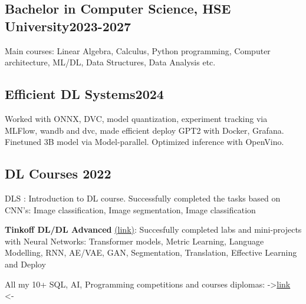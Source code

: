 
\subsection{{Bachelor in Computer Science, HSE University}\hfill 2023-2027}
\vspace*{3pt}
Main courses: Linear Algebra, Calculus, Python programming, Computer architecture, ML/DL, Data Structures, Data Analysis etc.
\vspace*{10pt}


\subsection{{Efficient DL Systems}\hfill 2024}
\vspace*{3pt}
Worked with ONNX, DVC, model quantization, experiment tracking via MLFlow, wandb and dvc, made efficient deploy GPT2 with Docker, Grafana. Finetuned 3B model via Model-parallel. Optimized inference with OpenVino. 

\vspace*{10pt}

\subsection{{DL Courses }\hfill 2022}
\begin{zitemize}
\item DLS : Introduction to DL course. Successfully completed the tasks based on CNN's: Image classification, Image segmentation, Image classification
\item \textbf{Tinkoff DL/DL Advanced} \href{https://github.com/Slavikss/tinkoff_DL}{(link)}: Succesfully completed labs and mini-projects with Neural Networks: Transformer models, Metric Learning, Language Modelling, RNN, AE/VAE, GAN, Segmentation, Translation, Effective Learning and Deploy
\item All my 10+ SQL, AI, Programming competitions and courses diplomas: ->\href{https://github.com/Slavikss/CVs/tree/master/diplomas/IT}{link} <-
\end{zitemize}




